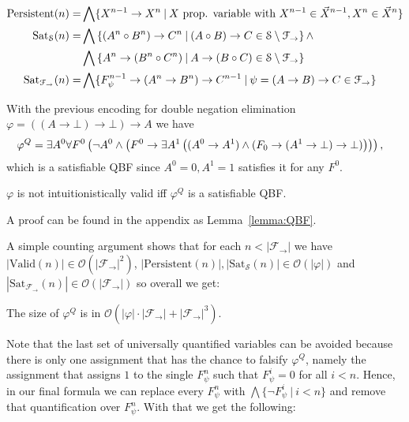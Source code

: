 \documentclass[a4paper,UKenglish,cleveref, autoref, thm-restate]{lipics-v2021}
\begin{document}
\begin{definition}
\begin{align*}
		\text{\normalfont Persistent}(n) = & \bigwedge\{X^{n-1}\to X^n\:|\: X \text{ prop. variable with }X^{n-1}\in\vec X^{n-1}, X^n \in\vec X^{n}\}\\
		\text{\normalfont Sat}_{\mathcal S}(n) = &\bigwedge\left\{(A^n\circ B^n)\to C^n\:|\:(A\circ B)\to C\in \mathcal S\setminus\mathcal F_\to\right\}\wedge\\
		&\bigwedge\left\{A^n\to (B^n\circ C^n)\:|\:A\to (B\circ C)\in \mathcal S\setminus\mathcal F_\to\right\}\\
		\text{\normalfont Sat}_{\mathcal F_\to}(n) = & \bigwedge\{F^{n-1}_\psi\to (A^n\to B^n)\to C^{n-1}\:|\:\psi = (A\to B)\to C\in\mathcal F_\to\}
	\end{align*}
\end{definition}

\begin{example}
	With the previous encoding for double negation elimination $\varphi = ((A\to \bot)\to \bot)\to A$ we have
	$$\hspace*{-.3cm}
	\varphi^Q = \exists A^0\forall F^0\left(\neg A^0\wedge\left(F^0\to \exists A^1\left((A^0\to A^1)\wedge(F_0\to (A^1\to \bot)\to \bot)\right)\right)\right),
	$$
	which is a satisfiable QBF since $A^0 = 0, A^1 = 1$ satisfies it for any $F^0$.
\end{example}


\begin{lemma}
	$\varphi$ is not intuitionistically valid iff $\varphi^Q$ is a satisfiable QBF.
\end{lemma}
A proof can be found in the appendix as Lemma~\ref{lemma:QBF}.

A simple counting argument shows that for each $n < |\mathcal F_\to|$ we have $|\text{Valid}(n)|\in \mathcal O(|\mathcal F_\to|^2)$, $|\text{Persistent}(n)|, |\text{Sat}_{\mathcal S}(n)|\in \mathcal O(|\varphi|)$ and $|\text{Sat}_{\mathcal F_\to}(n)|\in \mathcal O(|\mathcal F_\to|)$ so overall we get:
\begin{lemma}
	The size of $\varphi^Q$ is in $\mathcal O(|\varphi|\cdot|\mathcal F_\to| + |\mathcal F_\to|^3)$.
\end{lemma}

Note that the last set of universally quantified variables can be avoided because there is only one assignment that has the chance to falsify $\varphi^Q$, namely the assignment that assigns $1$ to the single $F_\psi^n$ such that $F_\psi^i = 0$ for all $i < n$. Hence, in our final formula we can replace every $F_\psi^n$ with $\bigwedge\{\neg F_\psi^i\:|\:i < n\}$ and remove that quantification over $F_\psi^n$. With that we get the following:
\end{document}
